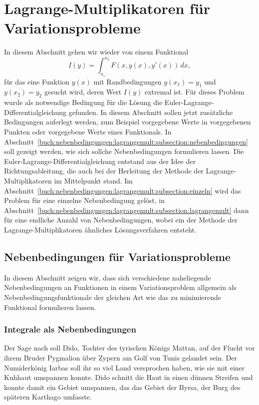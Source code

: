 %
%
%
\section{Lagrange-Multiplikatoren für Variationsprobleme
\label{buch:nebenbedingungen:section:lagrangemult}}
In diesem Abschnitt gehen wir wieder von einem Funktional
\begin{equation}
I(y)
=
\int_{x_1}^{x_2}
F(x,y(x),y'(x))
\,dx,
\label{buch:nebenbedingungen:lagrangemult:eqn:}
\end{equation}
für das eine Funktion $y(x)$ mit Randbedingungen $y(x_1)=y_1$ und
$y(x_2)=y_2$ gesucht wird, deren Wert $I(y)$ extremal ist.
Für dieses Problem wurde als notwendige Bedingung für die Lösung die
Euler-Lagrange-Differentialgleichung gefunden.
In diesem Abschnitt sollen jetzt zusätzliche Bedingungen auferlegt 
werden, zum Beispiel vorgegebene Werte in vorgegebenen Punkten oder
vorgegebene Werte eines Funktionals.
In
Abschnitt~\ref{buch:nebenbedingungen:lagrangemult:subsection:nebenbedingungen}
soll gezeigt werden, wie sich sollche Nebenbedingungen formulieren
lassen.
Die Euler-Lagrange-Differentialgleichung entstand aus der Idee
der Richtungsableitung, die auch bei der Herleitung der Methode
der Lagrange-Multiplikatoren im Mittelpunkt stand.
Im
Abschnitt~\ref{buch:nebenbedingungen:lagrangemult:subsection:einzeln}
wird das Problem für eine einzelne Nebenbedingung gelöst, in
Abschnitt~\ref{buch:nebenbedingungen:lagrangemult:subsection:lagrangemult}
dann für eine endliche Anzahl von Nebenbedingungen, wobei ein der
Methode der Lagrange-Multiplikatoren ähnliches Lösungsverfahren entsteht.

%
%
\subsection{Nebenbedingungen für Variationsprobleme
\label{buch:nebenbedingungen:lagrangemult:subsection:nebenbedingungen}}
In diesem Abschnitt zeigen wir, dass sich verschiedene naheliegende
Nebenbedingungen an Funktionen in einem Variationsproblem allgemein
als Nebenbedingungsfunktionale der gleichen Art wie das zu minimierende
Funktional formulieren lassen.

%
%
\subsubsection{Integrale als Nebenbedingungen}
Der Sage nach soll Dido, Tochter des tyrischen Königs Mattan, auf der
Flucht vor ihrem Bruder Pygmalion über Zypern am Golf von Tunis 
gelandet sein.
%
%
%
%
Der Numiderkönig Iarbas soll ihr so viel Land versprochen haben, wie
sie mit einer Kuhhaut umspannen konnte.
%
Dido schnitt die Haut in einen dünnen Streifen und konnte damit ein
Gebiet umspannen, das das Gebiet der Byrsa, der Burg des späteren
Karthago umfasste.
%
%

